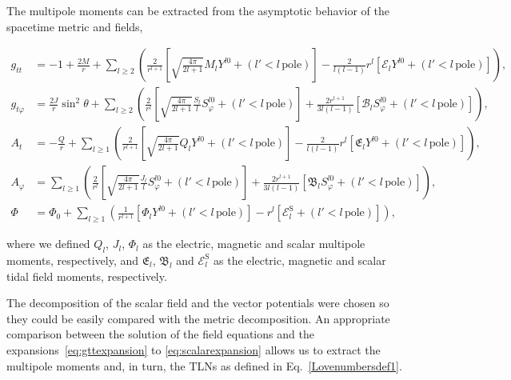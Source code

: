 \documentclass[aps,twocolumn,showpacs,preprintnumbers,nofootinbib,prd,superscriptaddress,groupedaddress,10pt]{revtex4-1}
\begin{document}
The multipole moments can be extracted from the asymptotic behavior of the spacetime metric and fields,
%
\begin{widetext}
\begin{align}
\label{eq:gttexpansion}
g_{tt}&=-1+\frac{2M}{r}+ \sum_{l\geq 2}\left(\frac{2}{r^{l+1}}\left[\sqrt{\frac{4\pi}{2l+1}}M_l Y^{l0}  + (l'<l\,\text{pole})\right]-\frac{2}{l(l-1)}r^l\left[\mathcal{E}_l Y^{l0}+(l'<l\,\text{pole})\right]\right),\\
\label{eq:gtphiexpansion}
g_{t\varphi}&=\frac{2J}{r}\sin^2{\theta}+\sum_{l\geq 2}\left( \frac{2}{r^l}\left[\sqrt{\frac{4\pi}{2l+1}}\frac{S_l}{l}S_\varphi^{l0}+\left(l'< l\,\text{pole}\right)\right]+\frac{2r^{l+1}}{3l\left(l-1\right)}\left[\mathcal{B}_l S^{l0}_\varphi+\left(l'< l\,\text{pole}\right)\right] \right),\\
\label{eq:Atexpansion}
A_t&=-\frac{Q}{r}+\sum_{l\geq 1}\left(\frac{2}{r^{l+1}}\left[\sqrt{\frac{4\pi}{2l+1}}Q_l Y^{l0} +\left(l'<l\,\text{pole}\right)\right]-\frac{2}{l(l-1)}r^l\left[\mathfrak{E}_lY^{l0}+\left(l'< l\,\text{pole}\right)\right]\right),\\
\label{eq:Aphiexpansion}
A_\varphi &=\sum_ {l\geq 1} \left(\frac{2}{r^l}\left[\sqrt{\frac{4\pi}{2l+1}}\frac{J_l}{l} S_\varphi^{l0} + \left(l'<l\,\text{pole}\right)\right]+\frac{2r^{l+1}}{3l\left(l-1\right)}\left[\mathfrak{B}_l  S_\varphi^{l0}+\left(l'< l\,\text{pole}\right)\right]\right),\\
\label{eq:scalarexpansion}
\Phi&=\Phi_0 +\sum_{l\geq 1} \left(\frac{1}{r^{l+1}}\left[\Phi_l Y^{l0} + (l'<l \,\text{pole})\right]- r^l \left[\mathcal{E}^\text{S}_l+\left(l'< l\,\text{pole}\right)\right]\right),
\end{align}
\end{widetext}
%
where we defined $Q_l$, $J_l$, $\Phi_l$ as the electric, magnetic and scalar multipole moments, respectively, and $\mathfrak{E}_l$, $\mathfrak{B}_l$ and $\mathcal{E}^\text{S}_l$ as the electric, magnetic and scalar tidal field moments, respectively.

The decomposition of the scalar field and the vector potentials were chosen so they could be easily compared with the metric decomposition.
An appropriate comparison between the solution of the field equations and the expansions~\eqref{eq:gttexpansion} to \eqref{eq:scalarexpansion} allows us to extract the multipole moments and, in turn, the TLNs as defined in Eq.~\eqref{Lovenumbersdef1}.


\end{document}
